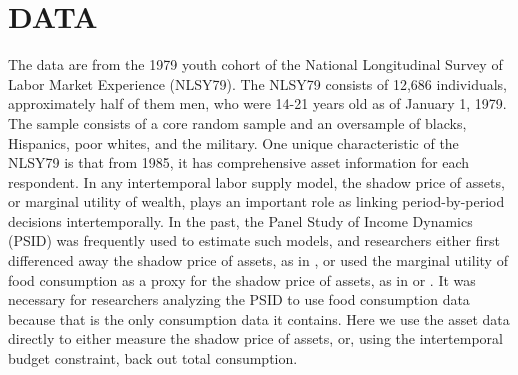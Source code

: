 \documentclass[\econtexRoot/ImaiKeane]{subfiles}
\begin{document}
\section{DATA}
\label{section:data}
The data are from the 1979 youth cohort of the National Longitudinal Survey of Labor Market Experience (NLSY79). The NLSY79 consists of 12,686 individuals, approximately half of them men, who were 14-21 years old as of January 1, 1979. The sample consists of a core random sample and an oversample of blacks, Hispanics, poor whites, and the military. One unique characteristic of the NLSY79 is that from 1985, it has comprehensive asset information for each respondent. In any intertemporal labor supply model, the shadow price of assets, or marginal utility of wealth, plays an important role as linking period-by-period decisions intertemporally. In the past, the Panel Study of Income Dynamics (PSID) was frequently used to estimate such models, and researchers either first differenced away the shadow price of assets, as in \cite{MaCurdy1981-iy}, or used the marginal utility of food consumption as a proxy for the shadow price of assets, as in  \cite{Altonji1986-zf} or \cite{Shaw1989-jb}. It was necessary for researchers analyzing the PSID to use food consumption data because that is the only consumption data it contains. Here we use the asset data directly to either measure the shadow price of assets, or, using the intertemporal budget constraint, back out total consumption. \par
\end{document}
